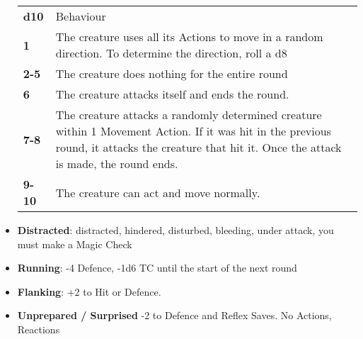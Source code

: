 \documentclass[landscape,10pt,a4paper]{article}
\begin{document}
\begin{multicols}{3}
\begin{dmbox}[title=Conditions - page \pageref{conditions}]
\begin{itemize}[leftmargin=0.5cm,itemsep=-1pt,parsep=0pt]
\noindent\begin{tabularx}{0.99\textwidth}{lX}
\hline
\textbf{d10} & Behaviour\\
\textbf{1} & The creature uses all its Actions to move in a random direction. To determine the direction, roll a d8\\
\textbf{2-5} & The creature does nothing for the entire round\\
\textbf{6} & The creature attacks itself and ends the round.\\
\textbf{7-8} & The creature attacks a randomly determined creature within 1 Movement Action. If it was hit in the previous round, it attacks the creature that hit it. Once the attack is made, the round ends.\\
\textbf{9-10} & The creature can act and move normally.\\
\end{tabularx}

\item \textbf{Distracted}: distracted, hindered, disturbed, bleeding, under attack, you must make a Magic Check
\item \textbf{Running}: -4 Defence, -1d6 TC until the start of the next round
\item \textbf{Flanking}: +2 to Hit or Defence.
\item \textbf{Unprepared / Surprised} -2 to Defence and Reflex Saves. No Actions, Reactions
\end{itemize}

\end{dmbox}



\begin{dmbox}[title=Conditions]
\begin{itemize}[leftmargin=0.5cm,itemsep=-1pt,parsep=0pt]


\end{itemize}
\end{dmbox}
\end{multicols}
\end{document}
